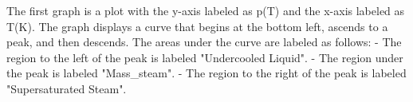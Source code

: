 The first graph is a plot with the y-axis labeled as p(T) and the x-axis labeled as T(K). The graph displays a curve that begins at the bottom left, ascends to a peak, and then descends. The areas under the curve are labeled as follows:
- The region to the left of the peak is labeled "Undercooled Liquid".
- The region under the peak is labeled "Mass\_steam".
- The region to the right of the peak is labeled "Supersaturated Steam".